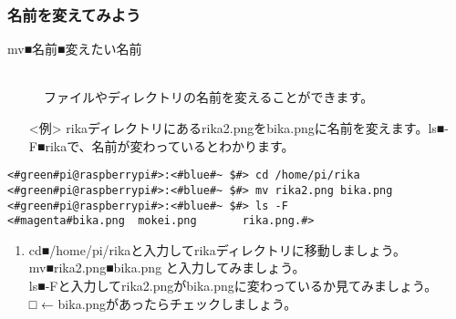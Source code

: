 \subsubsection{名前を変えてみよう}
\begin{description}
\item[mv■名前■変えたい名前]\mbox{}\\
ファイルやディレクトリの名前を変えることができます。
\end{description}
\begin{itemize}
\item[<例>]rikaディレクトリにあるrika2.pngをbika.pngに名前を変えます。ls■-F■rikaで、名前が変わっているとわかります。
\end{itemize}
\begin{lstlisting}[caption=mvNameの例, label=mvName]
<#green#pi@raspberrypi#>:<#blue#~ $#> cd /home/pi/rika
<#green#pi@raspberrypi#>:<#blue#~ $#> mv rika2.png bika.png
<#green#pi@raspberrypi#>:<#blue#~ $#> ls -F
<#magenta#bika.png	mokei.png		rika.png.#>
\end{lstlisting}

\begin{tcolorbox}[title=\useOmetoi]
\begin{enumerate}
\item cd■/home/pi/rikaと入力してrikaディレクトリに移動しましょう。\\ mv■rika2.png■bika.png と入力してみましょう。\\ls■-Fと入力してrika2.pngがbika.pngに変わっているか見てみましょう。\\□ ← bika.pngがあったらチェックしましょう。
\end{enumerate}
\end{tcolorbox}